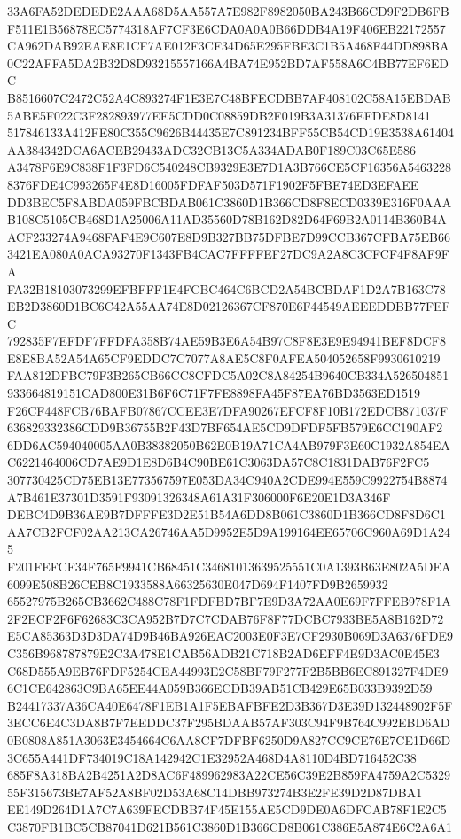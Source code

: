 \documentclass[UTF8,fontset=fandol,zihao=-4,a4paper]{ctexart}
\begin{document}
{{33A6FA52DEDEDE2AAA68D5AA557A7E982F8982050BA243B66CD9F2DB6FBF511E1B56878EC5774318AF7CF3E6CDA0A0A0B66DDB4A19F406EB22172557
CA962DAB92EAE8E1CF7AE012F3CF34D65E295FBE3C1B5A468F44DD898BA0C22AFFA5DA2B32D8D93215557166A4BA74E952BD7AF558A6C4BB77EF6EDC
B8516607C2472C52A4C893274F1E3E7C48BFECDBB7AF408102C58A15EBDAB5ABE5F022C3F282893977EE5CDD0C08859DB2F019B3A31376EFDE8D8141
517846133A412FE80C355C9626B44435E7C891234BFF55CB54CD19E3538A61404AA384342DCA6ACEB29433ADC32CB13C5A334ADAB0F189C03C65E586
A3478F6E9C838F1F3FD6C540248CB9329E3E7D1A3B766CE5CF16356A54632288376FDE4C993265F4E8D16005FDFAF503D571F1902F5FBE74ED3EFAEE
DD3BEC5F8ABDA059FBCBDAB061C3860D1B366CD8F8ECD0339E316F0AAAB108C5105CB468D1A25006A11AD35560D78B162D82D64F69B2A0114B360B4A
ACF233274A9468FAF4E9C607E8D9B327BB75DFBE7D99CCB367CFBA75EB663421EA080A0ACA93270F1343FB4CAC7FFFFEF27DC9A2A8C3CFCF4F8AF9FA
FA32B18103073299EFBFFF1E4FCBC464C6BCD2A54BCBDAF1D2A7B163C78EB2D3860D1BC6C42A55AA74E8D02126367CF870E6F44549AEEEDDBB77FEFC
792835F7EFDF7FFDFA358B74AE59B3E6A54B97C8F8E3E9E94941BEF8DCF8E8E8BA52A54A65CF9EDDC7C7077A8AE5C8F0AFEA504052658F9930610219
FAA812DFBC79F3B265CB66CC8CFDC5A02C8A84254B9640CB334A526504851933664819151CAD800E31B6F6C71F7FE8898FA45F87EA76BD3563ED1519
F26CF448FCB76BAFB07867CCEE3E7DFA90267EFCF8F10B172EDCB871037F636829332386CDD9B36755B2F43D7BF654AE5CD9DFDF5FB579E6CC190AF2
6DD6AC594040005AA0B38382050B62E0B19A71CA4AB979F3E60C1932A854EAC6221464006CD7AE9D1E8D6B4C90BE61C3063DA57C8C1831DAB76F2FC5
307730425CD75EB13E773567597E053DA34C940A2CDE994E559C9922754B8874A7B461E37301D3591F93091326348A61A31F306000F6E20E1D3A346F
DEBC4D9B36AE9B7DFFFE3D2E51B54A6DD8B061C3860D1B366CD8F8D6C1AA7CB2FCF02AA213CA26746AA5D9952E5D9A199164EE65706C960A69D1A245
F201FEFCF34F765F9941CB68451C34681013639525551C0A1393B63E802A5DEA6099E508B26CEB8C1933588A66325630E047D694F1407FD9B2659932
65527975B265CB3662C488C78F1FDFBD7BF7E9D3A72AA0E69F7FFEB978F1A2F2ECF2F6F62683C3CA952B7D7C7CDAB76F8F77DCBC7933BE5A8B162D72
E5CA85363D3D3DA74D9B46BA926EAC2003E0F3E7CF2930B069D3A6376FDE9C356B968787879E2C3A478E1CAB56ADB21C718B2AD6EFF4E9D3AC0E45E3
C68D555A9EB76FDF5254CEA44993E2C58BF79F277F2B5BB6EC891327F4DE96C1CE642863C9BA65EE44A059B366ECDB39AB51CB429E65B033B9392D59
B24417337A36CA40E6478F1EB1A1F5EBAFBFE2D3B367D3E39D132448902F5F3ECC6E4C3DA8B7F7EEDDC37F295BDAAB57AF303C94F9B764C992EBD6AD
0B0808A851A3063E3454664C6AA8CF7DFBF6250D9A827CC9CE76E7CE1D66D3C655A441DF734019C18A142942C1E32952A468D4A8110D4BD716452C38
685F8A318BA2B4251A2D8AC6F489962983A22CE56C39E2B859FA4759A2C532955F315673BE7AF52A8BF02D53A68C14DBB973274B3E2FE39D2D87DBA1
EE149D264D1A7C7A639FECDBB74F45E155AE5CD9DE0A6DFCAB78F1E2C5C3870FB1BC5CB87041D621B561C3860D1B366CD8B061C386E5A874E6C2A6A1
}}
\end{document}
